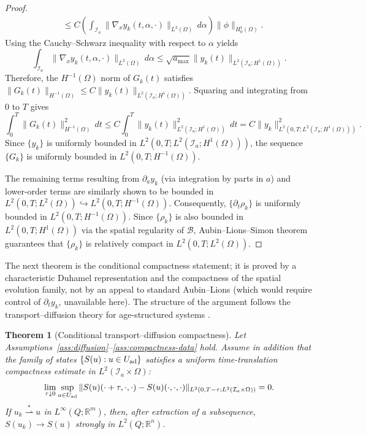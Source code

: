 \documentclass[pdflatex,sn-mathphys-num]{sn-jnl}
\theoremstyle{plain}
\newtheorem{theorem}{Theorem}[section]
\theoremstyle{definition}
\theoremstyle{remark}
\newcommand{\R}{\mathbb R}
\begin{document}
\begin{proof}
\begin{align*}
&\le C \left( \int_{\mathcal I_a} \|\nabla_x y_k(t,\alpha,\cdot)\|_{L^2(\Omega)} \, d\alpha \right) \|\phi\|_{H^1_0(\Omega)} .
\end{align*}
Using the Cauchy--Schwarz inequality with respect to \(\alpha\) yields
\[
\int_{\mathcal I_a} \|\nabla_x y_k(t,\alpha,\cdot)\|_{L^2(\Omega)} \, d\alpha \le \sqrt{a_{\max}} \|y_k(t)\|_{L^2(\mathcal I_a; H^1(\Omega))} .
\]
Therefore, the \(H^{-1}(\Omega)\) norm of \(G_k(t)\) satisfies
$\displaystyle \|G_k(t)\|_{H^{-1}(\Omega)} \le C \|y_k(t)\|_{L^2(\mathcal I_a; H^1(\Omega))} $.
Squaring and integrating from \(0\) to \(T\) gives
\[
\int_0^T \|G_k(t)\|^2_{H^{-1}(\Omega)} \, dt \le C \int_0^T \|y_k(t)\|^2_{L^2(\mathcal I_a; H^1(\Omega))} \, dt = C \|y_k\|^2_{L^2(0,T; L^2(\mathcal I_a; H^1(\Omega)))} .
\]
Since \(\{y_k\}\) is uniformly bounded in \(L^2(0,T; L^2(\mathcal I_a; H^1(\Omega)))\), the sequence \(\{G_k\}\) is uniformly bounded in \(L^2(0,T; H^{-1}(\Omega))\). 

The remaining terms resulting from \(\partial_a y_k\) (via integration by parts in \(a\)) and lower-order terms are similarly shown to be bounded in \(L^2(0,T; L^2(\Omega)) \hookrightarrow L^2(0,T; H^{-1}(\Omega))\). Consequently, \(\{\partial_t \rho_k\}\) is uniformly bounded in \(L^2(0,T; H^{-1}(\Omega))\). Since \(\{\rho_k\}\) is also bounded in \(L^2(0,T; H^1(\Omega))\) via the spatial regularity of \(\mathcal B\), Aubin--Lions--Simon theorem guarantees that \(\{\rho_k\}\) is relatively compact in \(L^2(0,T; L^2(\Omega))\).
\end{proof}

The next theorem is the conditional compactness statement; it is proved by a
characteristic Duhamel representation and the compactness of the spatial
evolution family, not by an appeal to standard Aubin--Lions (which would
require control of $\partial_t y_k$, unavailable here). The structure of the
argument follows the transport--diffusion theory for age-structured systems
\cite{webb1985theory,langlais1985nonlinear,yu2026chemotactic}.

\begin{theorem}[Conditional transport--diffusion compactness]
\label{thm:transport-diffusion-compactness}
Let Assumptions~\ref{ass:diffusion}--\ref{ass:compactness-data} hold. Assume in addition that the family of states \(\{S(u):u\in U_{\rm ad}\}\) satisfies a uniform time-translation compactness estimate in \(L^2(\mathcal I_a\times \Omega)\):
\[
\lim_{\tau\downarrow0}
\sup_{u\in U_{\rm ad}}
\|S(u)(\cdot+\tau,\cdot,\cdot)-S(u)(\cdot,\cdot,\cdot)\|_{L^2(0,T-\tau;L^2(\mathcal I_a\times \Omega))}
=0 .
\]
If \(u_k\overset{*}{\rightharpoonup}u\) in \(L^\infty(Q;\R^m)\), then, after extraction of a subsequence, $S(u_k)\to S(u)$ strongly in $L^2(Q;\R^n)$.
\end{theorem}
\end{document}
